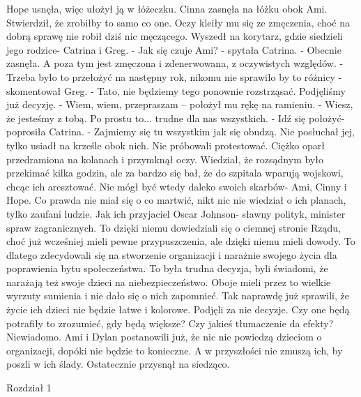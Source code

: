 \documentclass[12pt,a4paper]{book}
\begin{document}
Hope usnęła, więc ułożył ją w łóżeczku. Cinna zasnęła na łóżku obok Ami. Stwierdził, że zrobiłby to samo co one. Oczy kleiły mu się ze zmęczenia, choć na dobrą sprawę nie robił dziś nic męczącego.  
Wyszedł na korytarz, gdzie siedzieli jego rodzice- Catrina i Greg.
- Jak się czuje Ami? -  spytała Catrina.
- Obecnie zasnęła. A poza tym jest zmęczona i zdenerwowana, z oczywistych względów. 
- Trzeba było to przełożyć na następny rok, nikomu nie sprawiło by to różnicy - skomentował Greg.
- Tato, nie będziemy tego ponownie rozstrząsać. Podjęliśmy już decyzję.
- Wiem, wiem, przepraszam – położył mu rękę na ramieniu. - Wiesz, że jesteśmy z tobą. Po prostu to... trudne dla nas wszystkich. 
- Idź się położyć- poprosiła Catrina. - Zajmiemy się tu wszystkim jak się obudzą. 
Nie posłuchał jej, tylko usiadł na krześle obok nich. Nie próbowali protestować. Ciężko oparł przedramiona na kolanach i przymknął oczy. Wiedział, że rozsądnym było przekimać kilka godzin, ale za bardzo się bał, że do szpitala wparują wojskowi, chcąc ich aresztować. Nie mógł być wtedy daleko swoich skarbów-  Ami, Cinny i Hope. Co prawda nie miał się o co martwić, nikt nic nie wiedział o ich planach, tylko zaufani ludzie. Jak ich przyjaciel Oscar Johnson- sławny polityk, minister spraw zagranicznych. To dzięki niemu dowiedziali się o ciemnej stronie Rządu, choć już wcześniej mieli pewne przypuszczenia, ale dzięki niemu mieli dowody. To dlatego zdecydowali się na stworzenie organizacji i narażnie swojego życia dla poprawienia bytu społeczeństwa. To była trudna decyzja, byli świadomi, że narażają też swoje dzieci na niebezpieczeństwo. Oboje mieli przez to wielkie wyrzuty sumienia i nie dało się o nich zapomnieć. Tak naprawdę już sprawili, że życie ich dzieci nie będzie łatwe i kolorowe. Podjęli za nie decyzje. Czy one będą potrafiły to zrozumieć, gdy będą większe? Czy jakieś tłumaczenie da efekty? Niewiadomo. Ami i Dylan postanowili już, że nic nie powiedzą dzieciom o organizacji, dopóki nie będzie to konieczne. A w przyszłości nie zmuszą ich, by poszli w ich ślady.
Ostatecznie przysnął na siedząco. 


                     

                                     
                       Rozdział 1
\end{document}
